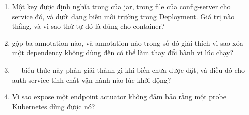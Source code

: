 \begin{quiz}
\begin{enumerate}
  \item Một key được định nghĩa trong  của jar,
  trong file của config-server cho service đó, và dưới dạng biến môi
  trường trong Deployment. Giá trị nào thắng, và vì sao thứ tự đó là đúng
  cho container?
  \item {} gộp ba annotation nào, và annotation
  nào trong số đó giải thích vì sao xóa một dependency không dùng đến có
  thể làm thay đổi hành vi lúc chạy?
  \item {} --- biểu thức này phân
  giải thành gì khi biến chưa được đặt, và điều đó cho auth-service tính
  chất vận hành nào lúc khởi động?
  \item Vì sao expose một endpoint actuator không đảm bảo rằng một probe
  Kubernetes dùng được nó?
\end{enumerate}
\end{quiz}
